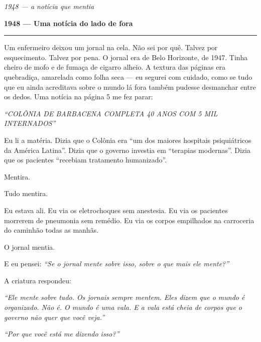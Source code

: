 
\noindent \textit{1948 --- a notícia que mentia}

\noindent \textbf{1948 --- Uma notícia do lado de fora}

\vspace{0.5em}\noindent\rule{\textwidth}{0.5pt}\vspace{0.5em}

\noindent Um enfermeiro deixou um jornal na cela. Não sei por quê. Talvez por esquecimento. Talvez por pena. O jornal era de Belo Horizonte, de 1947. Tinha cheiro de mofo e de fumaça de cigarro alheio. A textura das páginas era quebradiça, amarelada como folha seca --- eu segurei com cuidado, como se tudo que eu ainda acreditava sobre o mundo lá fora também pudesse desmanchar entre os dedos. Uma notícia na página 5 me fez parar:

\noindent \textit{\textquotedblleft{}COLÔNIA DE BARBACENA COMPLETA 40 ANOS COM 5 MIL INTERNADOS\textquotedblright{}}

\noindent Eu li a matéria. Dizia que o Colônia era \textquotedblleft{}um dos maiores hospitais psiquiátricos da América Latina\textquotedblright{}. Dizia que o governo investia em \textquotedblleft{}terapias modernas\textquotedblright{}. Dizia que os pacientes \textquotedblleft{}recebiam tratamento humanizado\textquotedblright{}.

\noindent Mentira.

\noindent Tudo mentira.

\noindent Eu estava ali. Eu via os eletrochoques sem anestesia. Eu via os pacientes morrerem de pneumonia sem remédio. Eu via os corpos empilhados na carroceria do caminhão todas as manhãs.

\noindent O jornal mentia.

\noindent E eu pensei: \textit{\textquotedblleft{}Se o jornal mente sobre isso, sobre o que mais ele mente?\textquotedblright{}}

\noindent A criatura respondeu:

\noindent \textit{\textquotedblleft{}Ele mente sobre tudo. Os jornais sempre mentem. Eles dizem que o mundo é organizado. Não é. O mundo é uma vala. E a vala está cheia de corpos que o governo não quer que você veja.\textquotedblright{}}

\noindent \textit{\textquotedblleft{}Por que você está me dizendo isso?\textquotedblright{}}

